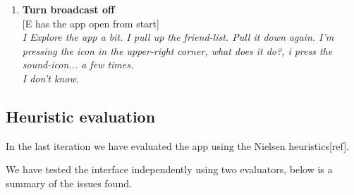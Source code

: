 \documentclass[runningheads,a4paper]{llncs}
\begin{document}
\begin{enumerate}
	\item \textbf{Turn broadcast off}\\
		{[}E has the app open from start{]}\\
		\textit{I Explore the app a bit. I pull up the friend-list. Pull it down again. I'm pressing the icon in the upper-right corner, what does it do?, i press the sound-icon... a few times. \\I don't know.}
		
\end{enumerate}

\subsection*{Heuristic evaluation} \label{heuristic}
In the last iteration we have evaluated the app using the Nielsen heuristics[ref].

We have tested the interface independently using two evaluators, below is a summary of the issues found.\\
\end{document}
